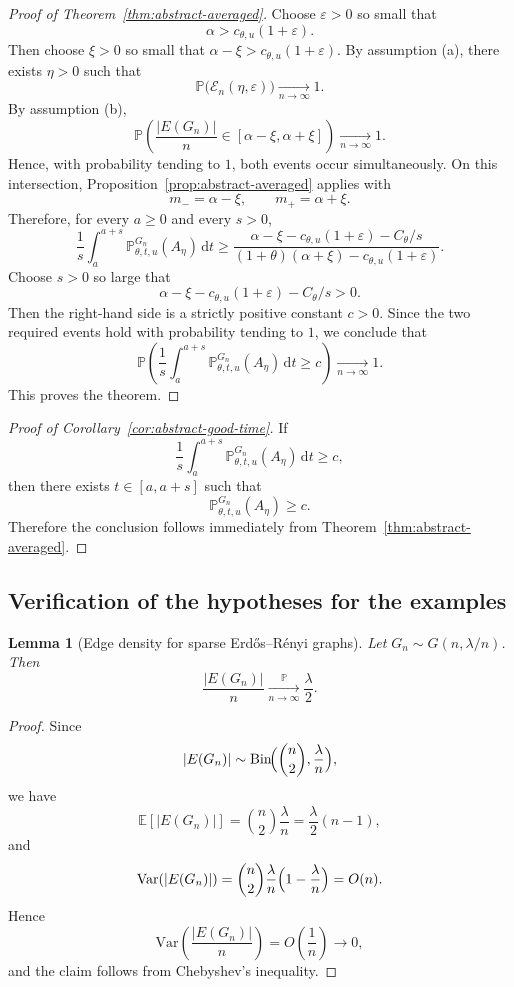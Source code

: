 \documentclass[11pt]{article}
\newtheorem{lemma}[theorem]{Lemma}
\theoremstyle{remark}
\theoremstyle{plain}
\newcommand{\Pbb}{\mathbb{P}}
\newcommand{\Ebb}{\mathbb{E}}
\newcommand{\1}{\mathbbm{1}}
\newcommand{\dd}{\mathrm{d}}
\begin{document}
\begin{proof}[Proof of Theorem~\ref{thm:abstract-averaged}]
Choose \(\varepsilon>0\) so small that
\[
\alpha>c_{\theta,u}(1+\varepsilon).
\]
Then choose \(\xi>0\) so small that $\alpha-\xi>c_{\theta,u}(1+\varepsilon)$.
By assumption \textnormal{(a)}, there exists \(\eta>0\) such that
\[
\Pbb\bigl(\mathcal E_n(\eta,\varepsilon)\bigr)\xrightarrow[n\to\infty]{}1.
\]
By assumption \textnormal{(b)},
\[
\Pbb\!\left(
\frac{|E(G_n)|}{n}\in[\alpha-\xi,\alpha+\xi]
\right)\xrightarrow[n\to\infty]{}1.
\]
Hence, with probability tending to \(1\), both events occur simultaneously. On this intersection,
Proposition~\ref{prop:abstract-averaged} applies with
\[
m_-=\alpha-\xi,
\qquad
m_+=\alpha+\xi.
\]
Therefore, for every \(a\ge 0\) and every \(s>0\),
\[
\frac1s\int_a^{a+s}\Pbb^{G_n}_{\theta,t,u}(A_\eta)\,\dd t
\ge
\frac{
\alpha-\xi-c_{\theta,u}(1+\varepsilon)-C_\theta/s
}{
(1+\theta)(\alpha+\xi)-c_{\theta,u}(1+\varepsilon)
}.
\]
Choose \(s>0\) so large that
\[
\alpha-\xi-c_{\theta,u}(1+\varepsilon)-C_\theta/s>0.
\]
Then the right-hand side is a strictly positive constant \(c>0\). Since the two required events
hold with probability tending to \(1\), we conclude that
\[
\Pbb\!\left(
\frac1s\int_a^{a+s}\Pbb^{G_n}_{\theta,t,u}(A_\eta)\,\dd t \ge c
\right)\xrightarrow[n\to\infty]{}1.
\]
This proves the theorem.
\end{proof}

\begin{proof}[Proof of Corollary~\ref{cor:abstract-good-time}]
If
\[
\frac1s\int_a^{a+s}\Pbb^{G_n}_{\theta,t,u}(A_\eta)\,\dd t\ge c,
\]
then there exists \(t\in[a,a+s]\) such that
\[
\Pbb^{G_n}_{\theta,t,u}(A_\eta)\ge c.
\]
Therefore the conclusion follows immediately from
Theorem~\ref{thm:abstract-averaged}.
\end{proof}

\subsection{Verification of the hypotheses for the examples}

\begin{lemma}[Edge density for sparse Erd\H{o}s--R\'enyi graphs]
\label{lem:ER-edge-density}
Let \(G_n\sim G(n,\lambda/n)\). Then
\[
\frac{|E(G_n)|}{n}\xrightarrow[n\to\infty]{\Pbb}\frac{\lambda}{2}.
\]
\end{lemma}

\begin{proof}
Since
\[
|E(G_n)|\sim \mathrm{Bin}\!\Bigl(\binom{n}{2},\frac{\lambda}{n}\Bigr),
\]
we have
\[
\Ebb[|E(G_n)|]=\binom{n}{2}\frac{\lambda}{n}
=\frac{\lambda}{2}(n-1),
\]
and
\[
\mathrm{Var}(|E(G_n)|)
=
\binom{n}{2}\frac{\lambda}{n}\Bigl(1-\frac{\lambda}{n}\Bigr)
=O(n).
\]
Hence
\[
\mathrm{Var}\!\left(\frac{|E(G_n)|}{n}\right)=O\!\left(\frac1n\right)\to 0,
\]
and the claim follows from Chebyshev's inequality.
\end{proof}
\end{document}

